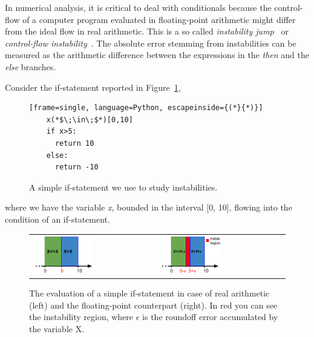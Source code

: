 In numerical analysis, it is critical to deal with conditionals because the control-flow of a computer program evaluated in floating-point arithmetic might differ from the ideal flow in real arithmetic.
%
%
This is a so called \emph{instability jump}~\cite{satire} or \emph{control-flow instability}~\cite{unstable}.
%
The absolute error stemming from instabilities can be measured as the arithmetic difference between the expressions in the \emph{then} and the \emph{else} branches.
%
%

Consider the if-statement reported in Figure~\ref{fig:ifstatement}, 
%
\begin{figure}[tb!]
	\begin{lstlisting}[frame=single, language=Python, escapeinside={(*}{*)}]
	x(*$\;\in\;$*)[0,10]
	if x>5:
	  return 10
	else:
	  return -10	
	\end{lstlisting}
	\caption{A simple if-statement we use to study instabilities.}\label{fig:ifstatement}
\end{figure}
%
where we have the variable \emph{x}, bounded in the interval [0, 10], flowing into the condition of an if-statement.
%

\begin{figure}[tb!]
	\centering
	\begin{tabular}{ll}
		\includegraphics[width=0.5\textwidth]{pic/ifreal.png}
		&
		\includegraphics[width=0.5\textwidth]{pic/iffp.png}
	\end{tabular}
	\caption{The evaluation of a simple if-statement in case of real arithmetic (left) and the floating-point counterpart (right). In red you can see the instability region, where $\epsilon$ is the roundoff error accumulated by the variable X.}
	\label{fig:ifreal}
\end{figure}

